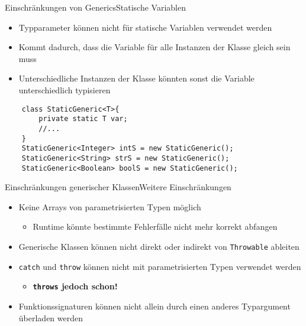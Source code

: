 \begin{frame}[fragile]{Einschränkungen von Generics}{Statische Variablen}
    \begin{itemize}
        \item Typparameter können nicht für statische Variablen verwendet werden
        \item Kommt dadurch, dass die Variable für alle Instanzen der Klasse gleich sein muss
        \item Unterschiedliche Instanzen der Klasse könnten sonst die Variable unterschiedlich typisieren
    \end{itemize}
    \lstset{style=java}
    \pause
    \begin{lstlisting}
    class StaticGeneric<T>{
        private static T var;
        //...
    }
    StaticGeneric<Integer> intS = new StaticGeneric();
    StaticGeneric<String> strS = new StaticGeneric();
    StaticGeneric<Boolean> boolS = new StaticGeneric();
    \end{lstlisting}
\end{frame}

\begin{frame}{Einschränkungen generischer Klassen}{Weitere Einschränkungen}
    \begin{itemize}
        \item Keine Arrays von parametrisierten Typen möglich
        \begin{itemize}
            \item Runtime könnte bestimmte Fehlerfälle nicht mehr korrekt abfangen
        \end{itemize}
        \item Generische Klassen können nicht direkt oder indirekt von \texttt{Throwable} ableiten
        \item \texttt{catch} und \texttt{throw} können nicht mit parametrisierten Typen verwendet werden
        \begin{itemize}
            \item \textbf{\texttt{throws} jedoch schon!}
        \end{itemize}
        \item Funktionssignaturen können nicht allein durch einen anderes Typargument überladen werden
    \end{itemize}
\end{frame}